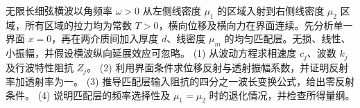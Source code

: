 无限长细弦横波以角频率 \(\omega>0\) 从左侧线密度 \(\mu_1\) 的区域入射到右侧线密度 \(\mu_2\) 区域，所有区域的拉力均为常数 \(T>0\)，横向位移及横向力在界面连续。先分析单一界面 \(x=0\)，再在两介质间加入厚度 \(d\)、线密度 \(\mu_m\) 的均匀匹配层。无损、线性、小振幅，并假设横波纵向延展效应可忽略。
(1) 从波动方程求相速度 \(c_j\)、波数 \(k_j\) 及行波特性阻抗 \(Z_j\)。
(2) 利用界面条件求位移反射与透射振幅系数，并证明反射率加透射率为一。
(3) 推导匹配层输入阻抗的四分之一波长变换公式，给出零反射条件。
(4) 说明匹配层的频率选择性及 \(\mu_1=\mu_2\) 时的退化情况，并检查所得量纲。
